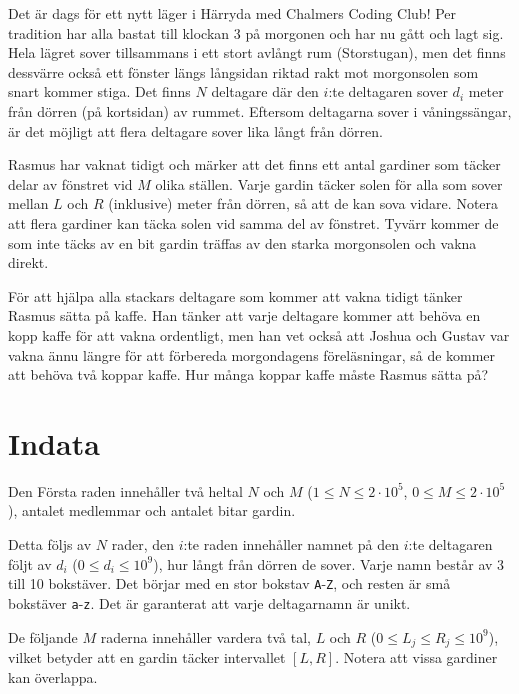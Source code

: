 
Det är dags för ett nytt läger i Härryda med Chalmers Coding Club! Per tradition har alla bastat till klockan 3 på
morgonen och har nu gått och lagt sig. Hela lägret sover tillsammans i ett stort avlångt rum (Storstugan), men det finns dessvärre
också ett fönster längs långsidan riktad rakt mot morgonsolen som snart kommer stiga. Det finns $N$ deltagare där den $i$:te deltagaren
sover $d_i$ meter från dörren (på kortsidan) av rummet. Eftersom deltagarna sover i våningssängar, är det möjligt att flera
deltagare sover lika långt från dörren.


Rasmus har vaknat tidigt och märker att det finns ett antal gardiner som täcker delar av fönstret vid $M$ olika ställen.
Varje gardin täcker solen för alla som sover mellan $L$ och $R$ (inklusive) meter från dörren, så att de kan sova vidare.
Notera att flera gardiner kan täcka solen vid samma del av fönstret.
Tyvärr kommer de som inte täcks av en bit gardin träffas av den starka morgonsolen och vakna direkt.

För att hjälpa alla stackars deltagare som kommer att vakna tidigt tänker Rasmus sätta på kaffe. Han tänker att varje
deltagare kommer att behöva en kopp kaffe för att vakna ordentligt, men han vet också att Joshua och Gustav
var vakna ännu längre för att förbereda morgondagens föreläsningar, så de kommer att behöva två koppar kaffe. Hur
många koppar kaffe måste Rasmus sätta på?


\section*{Indata}
Den Första raden innehåller två heltal $N$ och $M$ ($1 \le N \le 2 \cdot 10^5$, $0 \leq M \leq 2 \cdot 10^5$), antalet medlemmar och antalet bitar gardin.

Detta följs av $N$ rader, den $i$:te raden innehåller namnet på den $i$:te deltagaren följt av $d_i$ ($0 \le d_i \le 10^9$), hur långt
från dörren de sover. Varje namn består av 3 till 10 bokstäver. Det börjar med en stor bokstav \texttt{A}-\texttt{Z}, och resten är små bokstäver \texttt{a}-\texttt{z}.
Det är garanterat att varje deltagarnamn är unikt.

De följande $M$ raderna innehåller vardera två tal, $L$ och $R$ ($0 \le L_j \le R_j \le 10^9$),
vilket betyder att en gardin täcker intervallet $[L, R]$. Notera att vissa gardiner kan överlappa.


